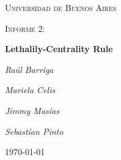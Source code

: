 \documentclass[11pt, spanish]{article}
\begin{document}
\begin{titlepage}
    \centering
    {\scshape\LARGE Universidad de Buenos Aires \par}
    \vspace{1cm}
    {\scshape\Large Informe 2:\par}

    \vspace{1.5cm}
    {\scshape\Large\par}
    {\huge\bfseries  Lethalily-Centrality Rule\par}
    \vspace{2cm}
    {\Large\itshape Ra\'ul Barriga\par}
    {\Large\itshape Mariela Celis\par}
    {\Large\itshape Jimmy Mas\'ias\par}
    {\Large\itshape Sebast\'ian Pinto\par}

    \vfill

    \vfill

    {\large \today\par}
\end{titlepage}

    \tableofcontents

    \newpage
    

    \newpage
    

    \newpage
    
    






\end{document}
